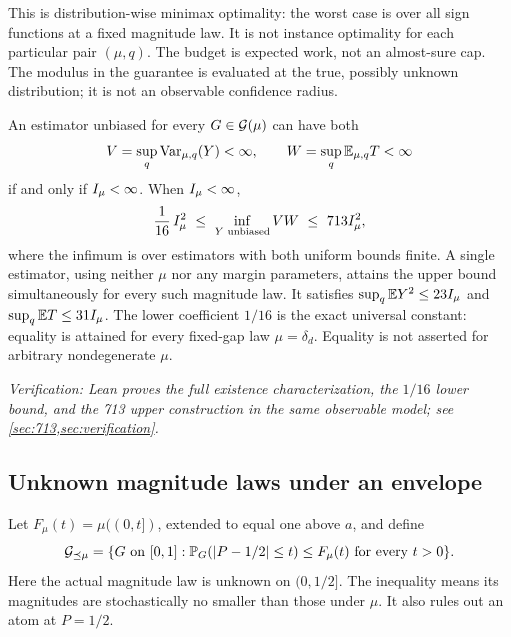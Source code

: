 This is distribution-wise minimax optimality: the worst case is over all
sign functions at a fixed magnitude law. It is not instance optimality
for each particular pair $(\mu,q)$. The budget is expected work, not an
almost-sure cap. The modulus in the guarantee is evaluated at the true,
possibly unknown distribution; it is not an observable confidence radius.

\begin{theorem}
\label{thm:unbiased}
An estimator unbiased for every $G\in\mathcal G(\mu)$ can have both
\[
 V=\sup_q\operatorname{Var}_{\mu,q}(Y)<\infty,\qquad
 W=\sup_q\mathbb E_{\mu,q}T<\infty
\]
if and only if $I_\mu<\infty$. When $I_\mu<\infty$,
\begin{equation}\label{eq:product}
 \frac1{16}\,I_\mu^2
 \ \le\ \inf_{Y\text{ unbiased}} VW
 \ \le\ 713I_\mu^2,
\end{equation}
where the infimum is over estimators with both uniform bounds finite.
A single estimator, using neither $\mu$ nor any margin parameters, attains
the upper bound simultaneously for every such magnitude law. It satisfies
$\sup_q\mathbb E Y^2\le23I_\mu$ and $\sup_q\mathbb E T\le31I_\mu$.
The lower coefficient $1/16$ is the exact universal constant: equality is
attained for every fixed-gap law $\mu=\delta_d$. Equality is not asserted
for arbitrary nondegenerate $\mu$.
\end{theorem}

\noindent\emph{Verification: Lean proves the full existence characterization,
the $1/16$ lower bound, and the 713 upper construction in the same
observable model; see \cref{sec:713,sec:verification}.}

\subsection{Unknown magnitude laws under an envelope}
Let $F_\mu(t)=\mu((0,t])$, extended to equal one above $a$, and define
\begin{equation}\label{eq:envelope-class}
 \mathcal G_{\preceq\mu}=
 \{G\text{ on }[0,1]:\mathbb P_G(|P-1/2|\le t)\le F_\mu(t)
                    \text{ for every }t>0\}.
\end{equation}
Here the actual magnitude law is unknown on $(0,1/2]$.
The inequality means its magnitudes are stochastically no smaller than
those under $\mu$. It also rules out an atom at $P=1/2$.


